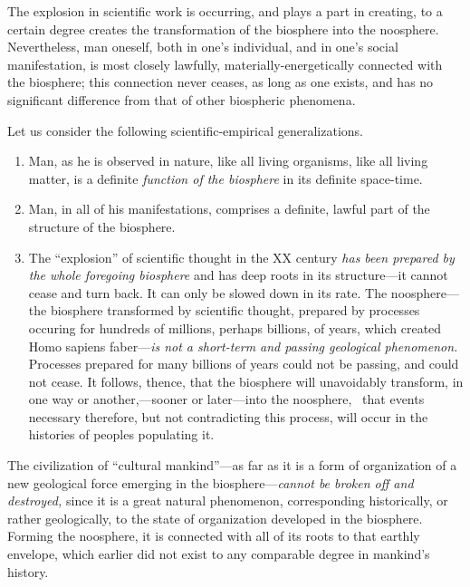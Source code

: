 The explosion in scientific work is occurring, and plays a part in creating, to
a certain degree creates the transformation of the biosphere into the
noosphere.  Nevertheless, man oneself, both in one's individual, and in one's
social manifestation, is most closely lawfully, materially-energetically
connected with the biosphere; this connection never ceases, as long as one
exists, and has no significant difference from that of other biospheric
phenomena.


\Section %
Let us consider the following scientific-empirical generalizations.

\begin{enumerate}
  \item Man, as he is observed in nature, like all living organisms, like all
  living matter, is a definite \emph{function of the biosphere }in its definite
  space-time.

  \item Man, in all of his manifestations, comprises a definite, lawful part of
  the structure of the biosphere.

  \item The ``explosion'' of scientific thought in the XX century \emph{has
  been prepared by the whole foregoing biosphere }and has deep roots in its
  structure---it cannot cease and turn back.  It can only be slowed down in its
  rate.  The noosphere---the biosphere transformed by scientific thought,
  prepared by processes occuring for hundreds of millions, perhaps billions, of
  years, which created Homo sapiens faber---\emph{is not a short-term and
  passing geological phenomenon. }Processes prepared for many billions of years
  could not be passing, and could not cease.  It follows, thence, that the
  biosphere will unavoidably transform, in one way or another,---sooner or
  later---into the noosphere, \ie\ that events necessary therefore, but not
  contradicting this process, will occur in the histories of peoples populating
  it.
\end{enumerate}

The civilization of ``cultural mankind''---as far as it is a form of
organization of a new geological force emerging in the biosphere---\emph{cannot
be broken off and destroyed, }since it is a great natural phenomenon,
corresponding historically, or rather geologically, to the state of
organization developed in the biosphere.  Forming the noosphere, it is
connected with all of its roots to that earthly envelope, which earlier did not
exist to any comparable degree in mankind's history.


